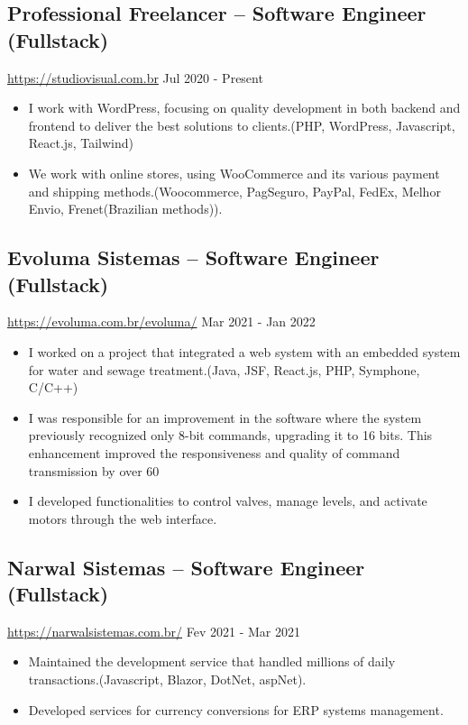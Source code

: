 \documentclass[11pt, a4paper]{article}
\begin{document}
\subsection*{Professional Freelancer -- Software Engineer (Fullstack)}
\href{https://evoluma.com.br/evoluma/}{https://studiovisual.com.br} \hfill Jul 2020 - Present
\begin{itemize}[noitemsep]
    \item I work with WordPress, focusing on quality development in both backend and frontend to deliver the best solutions to clients.(PHP, WordPress, Javascript, React.js, Tailwind)
    \item We work with online stores, using WooCommerce and its various payment and shipping methods.(Woocommerce, PagSeguro, PayPal, FedEx, Melhor Envio, Frenet(Brazilian methods)).
\end{itemize}

\subsection*{Evoluma Sistemas -- Software Engineer (Fullstack)}
\href{https://evoluma.com.br/evoluma/}{https://evoluma.com.br/evoluma/} \hfill Mar 2021 - Jan 2022
\begin{itemize}[noitemsep]
    \item I worked on a project that integrated a web system with an embedded system for water and sewage treatment.(Java, JSF, React.js, PHP, Symphone, C/C++)
    \item I was responsible for an improvement in the software where the system previously recognized only 8-bit commands, upgrading it to 16 bits. This enhancement improved the responsiveness and quality of command transmission by over 60%
    \item I developed functionalities to control valves, manage levels, and activate motors through the web interface.
\end{itemize}

\subsection*{Narwal Sistemas -- Software Engineer (Fullstack)}
\href{https://www.narwalsistemas.com.br/}{https://narwalsistemas.com.br/} \hfill Fev 2021 - Mar 2021
\begin{itemize}[noitemsep]
    \item Maintained the development service that handled millions of daily transactions.(Javascript, Blazor, DotNet, aspNet).
    \item Developed services for currency conversions for ERP systems management.
\end{itemize}
\end{document}
